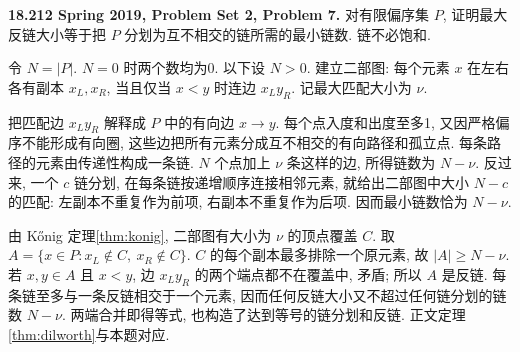 \begin{exercise}\label{mit:18212-pset2-q7}
\textbf{18.212 Spring 2019, Problem Set 2, Problem 7.}
对有限偏序集 $P$, 证明最大反链大小等于把 $P$ 分划为互不相交的链所需的最小链数. 链不必饱和.
\end{exercise}
\begin{solution}
令 $N=|P|$. $N=0$ 时两个数均为0. 以下设 $N>0$. 建立二部图: 每个元素 $x$ 在左右各有副本 $x_L,x_R$, 当且仅当 $x<y$ 时连边 $x_Ly_R$. 记最大匹配大小为 $\nu$.

把匹配边 $x_Ly_R$ 解释成 $P$ 中的有向边 $x\to y$. 每个点入度和出度至多1, 又因严格偏序不能形成有向圈, 这些边把所有元素分成互不相交的有向路径和孤立点. 每条路径的元素由传递性构成一条链. $N$ 个点加上 $\nu$ 条这样的边, 所得链数为 $N-\nu$. 反过来, 一个 $c$ 链分划, 在每条链按递增顺序连接相邻元素, 就给出二部图中大小 $N-c$ 的匹配: 左副本不重复作为前项, 右副本不重复作为后项. 因而最小链数恰为 $N-\nu$.

由 Kőnig 定理\ref{thm:konig}, 二部图有大小为 $\nu$ 的顶点覆盖 $C$. 取
$A=\{x\in P:x_L\notin C,\ x_R\notin C\}$. $C$ 的每个副本最多排除一个原元素, 故 $|A|\ge N-\nu$. 若 $x,y\in A$ 且 $x<y$, 边 $x_Ly_R$ 的两个端点都不在覆盖中, 矛盾; 所以 $A$ 是反链. 每条链至多与一条反链相交于一个元素, 因而任何反链大小又不超过任何链分划的链数 $N-\nu$. 两端合并即得等式, 也构造了达到等号的链分划和反链. 正文定理\ref{thm:dilworth}与本题对应.
\end{solution}

